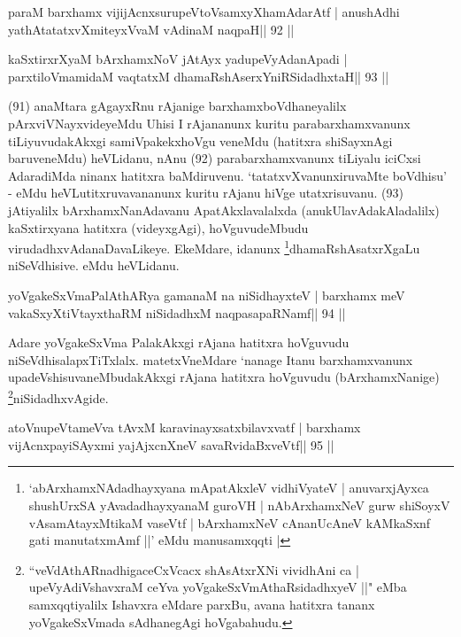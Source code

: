 \begin{shl}
paraM barxhamx vijijAcnxsurupeVtoV\s samxyXhamAdarAtf |
anushAdhi yathAtatatxvXmiteyxVvaM vAdinaM naqpaH\hfill || 92 ||
\end{shl}

\begin{shl}
kaSxtirxrXyaM bArxhamxNoV jAtAyx yadupeVyAdanApadi |
parxtiloVmamidaM vaqtatxM dhamaRshAserxYniRSidadhxtaH\hfill || 93 ||
\end{shl}

\begin{artha}
(91) anaMtara gAgayxRnu rAjanige barxhamxboVdhaneyalilx pArxviVNayxvideyeMdu Uhisi I rAjananunx kuritu parabarxhamxvanunx tiLiyuvudakAkxgi samiVpakekx\break hoVgu veneMdu (hatitxra shiSayxnAgi baruveneMdu) heVLidanu, nAnu (92) parabarxhamxvanunx tiLiyalu iciCxsi AdaradiMda ninanx hatitxra baMdiruvenu. `tatatxvXvanunx\break iruvaMte boVdhisu' - eMdu heVLutitxruvavananunx kuritu rAjanu hiVge utatxrisuvanu. (93) jAtiyalilx bArxhamxNanAdavanu ApatAkxlavalalxda (anukUlavAda\break kAladalilx) kaSxtirxyana hatitxra (videyxgAgi), hoVguvudeMbudu virudadhxvAda\break naDavaLikeye. EkeMdare, idanunx \footnote{`abArxhamxNAdadhayxyana mApatAkxleV vidhiVyateV | anuvarxjAyxca shushUrxSA yAvadadhayxyanaM guroVH | nAbArxhamxNeV gurw shiSoyxV vAsamAtayxMtikaM vaseVtf | bArxhamxNeV cAnanUcAneV kAMkaSxnf gati manutatxmAmf ||' eMdu manusamxqqti |}dhamaRshAsatxrXgaLu niSeVdhisive. eMdu heVLidanu.
\end{artha} 

\begin{shl}
yoVgakeSxVmaPalAthARya gamanaM na niSidhayxteV |
barxhamx meV vakaSxyXtiVtayxthaRM niSidadhxM naqpasapaRNamf\hfill || 94 ||
\end{shl}

\begin{artha}
Adare yoVgakeSxVma PalakAkxgi rAjana hatitxra hoVguvudu 
niSeVdhisalapxTiTxlalx. matetxVneMdare `nanage Itanu barxhamxvanunx 
upadeVshisuvaneMbudakAkxgi rAjana hatitxra hoVguvudu (bArxhamxNanige) 
\footnote{``veVdAthARnadhigaceCxVcacx shAsAtxrXNi vividhAni ca | 
upeVyAdiVshavxraM ceYva yoVgakeSxVmAthaRsidadhxyeV ||" eMba samxqqtiyalilx Ishavxra eMdare parxBu, avana hatitxra tananx yoVgakeSxVmada sAdhanegAgi hoVgabahudu.}niSidadhxvAgide.
\end{artha}

\begin{shl}
atoV\s nupeVtameVva tAvxM karavinayxsatxbilavxvatf |
barxhamx vijAcnxpayiSAyxmi yajAjxcnXneV savaRvidaBxveVtf\hfill || 95 ||
\end{shl}

